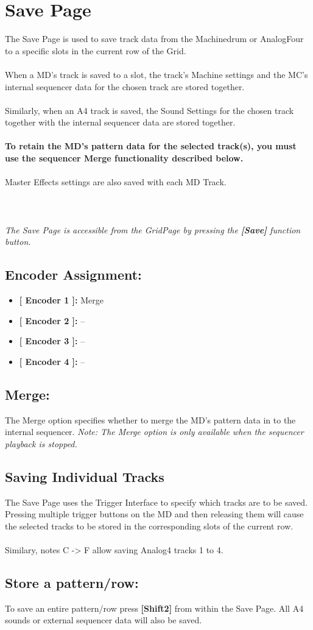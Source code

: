 \chapter{Save Page}

The Save Page is used to save track data from the Machinedrum or AnalogFour to a specific slots in the current row of the Grid.\\
\\
When a MD's track is saved to a slot, the track's Machine settings and the MC's internal sequencer data for the chosen track are stored together.\\
\\
Similarly, when an A4 track is saved, the Sound Settings for the chosen track together with the internal sequencer data are stored together.\\
\\
\textbf{To retain the MD's pattern data for the selected track(s), you must use the sequencer Merge functionality described below.}\\
\\Master Effects settings are also saved with each MD Track.\\\\
\\
\\
\textit{The Save Page is accessible from the GridPage by pressing the  \textbf{[Save]} function button.}
\section{Encoder Assignment:}
\begin{itemize}
	\item \textbf{[ Encoder 1 ]: }Merge
	\item \textbf{[ Encoder 2 ]: }--
	\item \textbf{[ Encoder 3 ]: }--
	\item \textbf{[ Encoder 4 ]: }--
\end{itemize}
\section{Merge:}
The Merge option specifies whether to merge the MD's pattern data in to the internal sequencer. \textit{Note: The Merge option is only available when the sequencer playback is stopped.}
\section{Saving Individual Tracks}
The Save Page uses the Trigger Interface to specify which tracks are to be saved. Pressing multiple trigger buttons on the MD and then releasing them will cause the selected tracks to be stored in the corresponding slots of the current row.\\ \\
Similary, notes C -> F allow saving Analog4 tracks 1 to 4.
\section{Store a pattern/row:}
To save an entire pattern/row press \textbf{[Shift2]} from within the Save Page. All A4 sounds or external sequencer data will also be saved.\\



